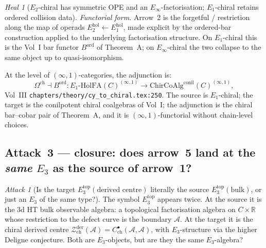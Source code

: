 \documentclass[11pt]{article}
\theoremstyle{definition}
\theoremstyle{remark}
\newtheorem{attack}[thm]{Attack}
\newtheorem{heal}[thm]{Heal}
\newcommand{\bR}{\mathbb{R}}
\newcommand{\cA}{\mathcal{A}}
\newcommand{\cZ}{\mathcal{Z}}
\newcommand{\Eone}{E_1}
\newcommand{\Etwo}{E_2}
\newcommand{\Ethree}{E_3}
\newcommand{\Einf}{E_\infty}
\newcommand{\Zder}{\cZ^{\mathrm{der}}_{\mathrm{ch}}}
\begin{document}
\begin{heal}[$\Etwo$-chiral has symmetric OPE and an
$\Einf$-factorisation; $\Eone$-chiral retains ordered collision
data]
\emph{Functorial form.} Arrow~2 is the forgetful / restriction
along the map of operads $\Etwo^{\mathrm{hol}} \leftarrow
\Eone^{\mathrm{hol}}$, made explicit by the ordered-bar
construction applied to the underlying factorisation structure.
On $\Eone\text{-chiral}$ this is the Vol~I bar functor
$B^{\mathrm{ord}}$ of Theorem~A; on $\Einf$-chiral the two
collapse to the same object up to quasi-isomorphism.

At the level of $(\infty,1)$-categories, the adjunction is:
\[
\Omega^{\mathrm{ch}} \dashv B^{\mathrm{ord}}\colon
\Eone\text{-HolFA}(C)^{(\infty,1)}
\longrightarrow
\mathrm{ChirCoAlg}^{\mathrm{conil}}(C)^{(\infty,1)},
\]
Vol~III \texttt{chapters/theory/cy\_to\_chiral.tex:250}. The
source is $\Eone$-chiral; the target is the conilpotent chiral
coalgebras of Vol~I; the adjunction is the chiral bar--cobar
pair of Theorem~A, and it is $(\infty,1)$-functorial without
chain-level choices.
\end{heal}

\subsection*{Attack~3 --- closure: does arrow~5 land at the
\emph{same} $\Ethree$ as the source of arrow~1?}

\begin{attack}[Is the target $\Ethree^{\mathrm{top}}(\text{derived
centre})$ literally the source $\Ethree^{\mathrm{top}}(\text{bulk})$,
or just an $\Ethree$ of the same type?]
\label{att:closure}
The symbol $\Ethree^{\mathrm{top}}$ appears twice. At the source it
is the $3$d HT bulk observable algebra: a topological factorisation
algebra on $C \times \bR$ whose restriction to the defect curve
is the boundary $\cA$. At the target it is the chiral derived
centre $\Zder(\cA) = C^\bullet_{\mathrm{ch}}(\cA, \cA)$, with
$\Ethree$-structure via the higher Deligne conjecture. Both are
$\Ethree$-objects, but are they the same $\Ethree$-algebra?
\end{attack}
\end{document}
